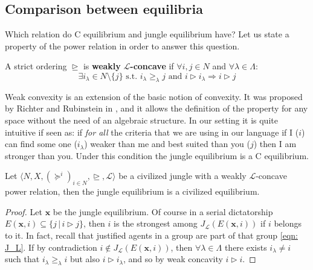 \subsection{Comparison between equilibria}

Which relation do C equilibrium and jungle equilibrium have? Let us state a property of the power relation in order to answer this question. 

\begin{definition}
    A strict ordering $\trianglerighteq$ is \textbf{weakly} $\mathcal{L}$\textbf{-concave} if $\forall i,j\in N$ and $\forall\lambda\in\Lambda$:
    \[\exists i_{\lambda}\in N\setminus\{j\} \text{ s.t. } i_{\lambda}\geq_{\lambda}j \text{ and } i\triangleright i_{\lambda} \Rightarrow i\triangleright j\]
\end{definition}

Weak convexity is an extension of the basic notion of convexity. It was proposed by Richter and Rubinstein in \cite[RR]{Convex_Pref}, and it allows the definition of the property for any space without the need of an algebraic structure. In our setting it is quite intuitive if seen as: if \textit{for all} the criteria that we are using in our language if I ($i$) can find some one ($i_{\lambda}$) weaker than me and best suited than you ($j$) then I am stronger than you. Under this condition the jungle equilibrium is a C equilibrium.



\begin{proposition}\label{Prop: undivisible, weakly concave L}
    Let $\langle N,X,(\succeq^i)_{i\in N}, \trianglerighteq, \mathcal{L}\rangle$ be a civilized jungle with a weakly $\mathcal{L}$-concave power relation, then the jungle equilibrium is a civilized equilibrium.

    \begin{proof}
        Let $\textbf{x}$ be the jungle equilibrium. Of course in a serial dictatorship $E(\textbf{x},i)\subseteq\{j\,|\,i\triangleright j\}$, then $i$ is the strongest among $J_{\mathcal{L}}(E(\textbf{x},i))$ if $i$ belongs to it. In fact, recall that justified agents in a group are part of that group \cref{eqn: J_L}. If by contradiction $i\notin J_{\mathcal{L}}(E(\textbf{x},i))$, then $\forall\lambda\in\Lambda$ there exists $i_{\lambda}\neq i$ such that $i_{\lambda}\geq_{\lambda}i$ but also $i\triangleright i_{\lambda}$, and so by weak concavity $i\triangleright i$.   
    \end{proof}
\end{proposition}

